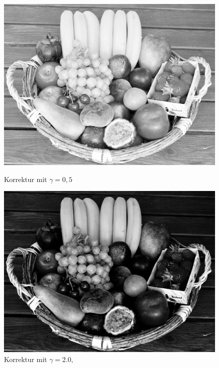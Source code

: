 \documentclass[course=erap]{aspdoc}
\begin{document}
\begin{figure}[h]
    \begin{minipage}{0.49\linewidth}
        \centering
        \includegraphics[scale=1.2]{Images/fruit_basket_gamma_0,5.png}
        \caption{Korrektur mit $\gamma = 0,5$}
    \end{minipage}
    \centering
    \begin{minipage}{0.49\linewidth}
        \centering
        \includegraphics[scale=1.2]{Images/fruit_basket_gamma_2.png}
        \caption{Korrektur mit $\gamma = 2.0,$}
    \end{minipage}
\end{figure}
\end{document}
